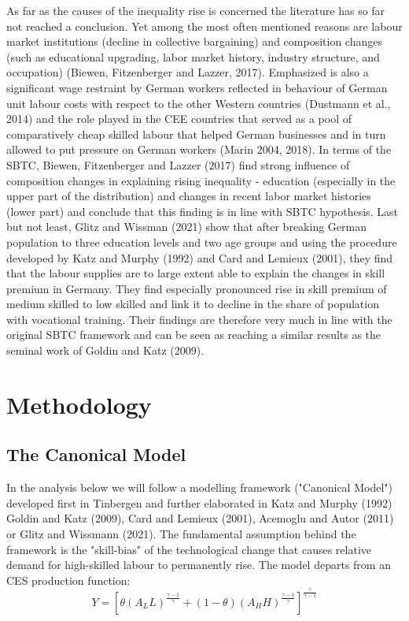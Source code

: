 \documentclass{article}
\begin{document}
As far as the causes of the inequality rise is concerned the literature has so far not reached a conclusion. Yet among the most often mentioned reasons are labour market institutions (decline in collective bargaining) and composition changes (such as educational upgrading, labor market history, industry structure, and occupation) (Biewen, Fitzenberger and Lazzer, 2017). Emphasized is also a significant wage restraint by German workers reflected in behaviour of German unit labour costs with respect to the other Western countries (Dustmann et al., 2014) and the role played in the CEE countries that served as a pool of comparatively cheap skilled labour that helped German businesses and in turn allowed to put pressure on German workers (Marin 2004, 2018).
In terms of the SBTC, Biewen, Fitzenberger and Lazzer (2017) find strong influence of composition changes in explaining rising inequality - education (especially in the upper part of the distribution) and changes in recent labor market histories (lower part) and conclude that this finding is in line with SBTC hypothesis.
Last but not least, Glitz and Wissman (2021) show that after breaking German population to three education levels and two age groups and using the procedure developed by Katz and Murphy (1992) and Card and Lemieux (2001), they find that the labour supplies are to large extent able to explain the changes in skill premium in Germany. They find especially pronounced rise in skill premium of medium skilled to low skilled and link it to decline in the share of population with vocational training. Their findings are therefore very much in line with the original SBTC framework and can be seen as reaching a similar results as the seminal work of Goldin and Katz (2009). %


\section{Methodology}
\subsection{The Canonical Model}
In the analysis below we will follow a modelling framework ("Canonical Model") developed first in Tinbergen and further elaborated in Katz and Murphy (1992) Goldin and Katz (2009), Card and Lemieux (2001), Acemoglu and Autor (2011) or Glitz and Wissmann (2021).
The fundamental assumption behind the framework is the "skill-bias" of the technological change that causes relative demand for high-skilled labour to permanently rise.
The model departs from an CES production function:
\begin{equation}
\label{eqn:STBC_prod_function}
Y = [\theta(A_{L}L)^{\frac{\gamma - 1}{\gamma}} + (1 - \theta)(A_{H}H)^{\frac{\gamma - 1}{\gamma}}]^\frac{\gamma}{\gamma - 1}
\end{equation}
\end{document}
